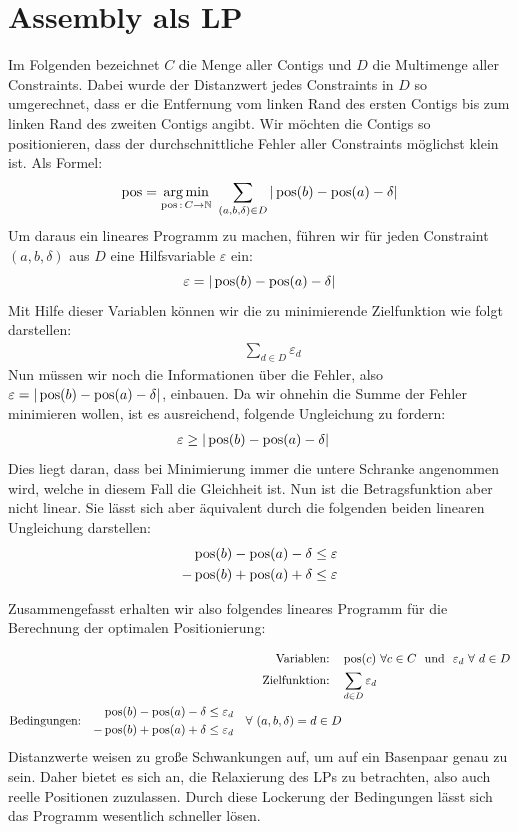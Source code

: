 \section{Assembly als LP}
Im Folgenden bezeichnet $C$ die Menge aller Contigs und $D$ die Multimenge aller Constraints. Dabei wurde der Distanzwert jedes Constraints in $D$ so umgerechnet, dass er die Entfernung 
vom linken Rand 
des ersten Contigs bis zum linken Rand des zweiten Contigs angibt.
Wir möchten die Contigs so positionieren, dass der durchschnittliche Fehler aller Constraints 
möglichst klein ist. Als Formel:
\[ \operatorname*{pos} = \operatorname*{arg\,min}_{\operatorname*{pos}\,:\, C \rightarrow \mathbb{N}} \ \sum_{(a,b,\delta) \in D} |\operatorname*{pos}(b) - \operatorname*{pos}(a) - \delta| \] 
Um daraus ein lineares Programm zu machen, führen wir für jeden Constraint $(a,b,\delta)$ aus $D$ eine Hilfsvariable $\varepsilon$ ein:
\[ \varepsilon = |\operatorname*{pos}(b) - \operatorname*{pos}(a) - \delta| \]
Mit Hilfe dieser Variablen können wir die zu minimierende Zielfunktion wie folgt darstellen:
\begin{align*}
\quad& \sum_{d \in D} \varepsilon_{d}
\end{align*}
Nun müssen wir noch die Informationen über die Fehler, also $\varepsilon = |\operatorname*{pos}(b) - \operatorname*{pos}(a) - \delta|$, einbauen. Da wir ohnehin die Summe der Fehler minimieren wollen, ist es ausreichend, folgende Ungleichung zu fordern:
\begin{align*}
\varepsilon \geq |\operatorname*{pos}(b) &- \operatorname*{pos}(a) - \delta|
\end{align*}
Dies liegt daran, dass bei Minimierung immer die untere Schranke angenommen wird, welche in diesem Fall die Gleichheit ist. Nun ist die Betragsfunktion aber nicht linear. Sie lässt sich aber äquivalent durch die folgenden beiden linearen Ungleichung darstellen:
\begin{align*}
\operatorname*{pos}(b) - \operatorname*{pos}(a) - \delta &\leq \varepsilon\\
-\operatorname*{pos}(b) + \operatorname*{pos}(a) + \delta &\leq \varepsilon
\end{align*}

Zusammengefasst erhalten wir also folgendes lineares Programm für die Berechnung der optimalen Positionierung:

\begin{align*}
\text{Variablen:}\quad& \pos(c) \ \forall c \in C \ \ \text{und} \ \ \varepsilon_{d} \ \forall \ d \in D\\
\text{Zielfunktion:}\quad& \sum_{d \in D} \varepsilon_{d}\\
\text{Bedingungen:}\quad \begin{split} \pos(b) - \pos(a) - \delta \leq \varepsilon_{d}\\
-\pos(b) + \pos(a) + \delta \leq \varepsilon_{d} \end{split}\quad \forall \ (a,b,\delta) = d \in D
\end{align*}
Distanzwerte weisen zu große Schwankungen auf, um auf ein Basenpaar genau zu sein. Daher bietet es sich an, die Relaxierung des LPs zu betrachten, also auch reelle Positionen zuzulassen. Durch diese Lockerung der Bedingungen lässt sich das Programm wesentlich schneller lösen.

